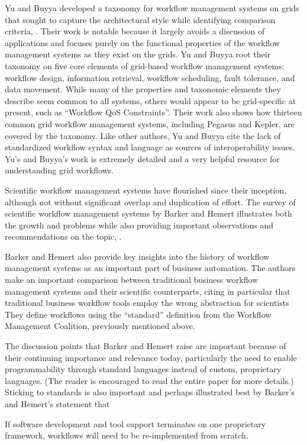Yu and Buyya developed a taxonomy for workflow management systems on
grids that sought to capture the architectural style while identifying
comparison criteria, \cite{yu_taxonomy_2005}. Their work is notable because it
largely avoids a discussion of applications and focuses purely on the
functional properties of the workflow management systems as they exist
on the grids. Yu and Buyya root their taxonomy on five core elements of
grid-based workflow management systems: workflow design, information
retrieval, workflow scheduling, fault tolerance, and data movement.
While many of the properties and taxonomic elements they describe seem
common to all systems, others would appear to be grid-specific at present, such
as ``Workflow QoS Constraints''. Their work also shows how thirteen common grid
workflow management systems, including Pegasus and Kepler, are covered by the
taxonomy. Like other authors, Yu and Buyya cite the lack of standardized
workflow syntax and language as sources of interoperability issues. Yu's and
Buyya's work is extremely detailed and a very helpful resource for
understanding grid workflows.

Scientific workflow management systems have flourished since their
inception, although not without significant overlap and duplication of
effort. The survey of scientific workflow management systems by Barker
and Hemert illustrates both the growth and problems while also providing
important observations and recommendations on the topic,
\cite{barker_scientific_2007}.

Barker and Hemert also provide key insights into the history of
workflow management systems as an important part of business
automation. The authors make an important comparison between traditional
business workflow management systems and their scientific counterparts,
citing in particular that traditional business workflow tools employ the
wrong abstraction for scientists They define workflows using the
``standard'' definition from the Workflow Management Coalition,
previously mentioned above.

The discussion points that Barker and Hemert raise are important because
of their continuing importance and relevance today, particularly the
need to enable programmability through standard languages instead of
custom, proprietary languages. (The reader is encouraged to read the
 entire paper for more details.) Sticking to
standards is also important and perhaps illustrated best by Barker's and
Hemert's statement that

\begin{displayquote}
If software development and tool support terminates on one proprietary 
framework, workflows will need to be re-implemented from scratch.
\end{displayquote}

